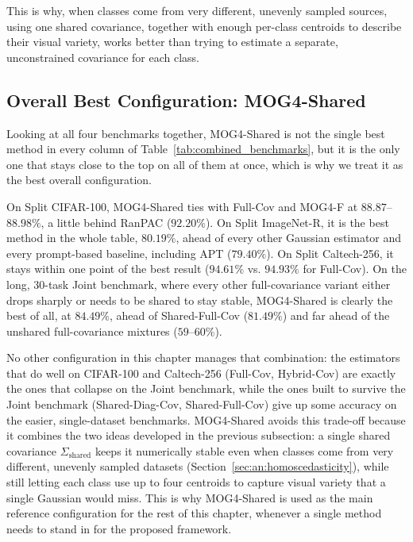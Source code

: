 This is why, when classes come from very different, unevenly sampled sources, using one shared covariance, together with enough per-class centroids to describe their visual variety, works better than trying to estimate a separate, unconstrained covariance for each class.

\subsection{Overall Best Configuration: MOG4-Shared}
\label{sec:an:mog4shared_best}

Looking at all four benchmarks together, MOG4-Shared is not the single best method in every column of Table~\ref{tab:combined_benchmarks}, but it is the only one that stays close to the top on all of them at once, which is why we treat it as the best overall configuration.

On Split CIFAR-100, MOG4-Shared ties with Full-Cov and MOG4-F at $88.87$--$88.98\%$, a little behind RanPAC ($92.20\%$). On Split ImageNet-R, it is the best method in the whole table, $80.19\%$, ahead of every other Gaussian estimator and every prompt-based baseline, including APT ($79.40\%$). On Split Caltech-256, it stays within one point of the best result ($94.61\%$ vs. $94.93\%$ for Full-Cov). On the long, 30-task Joint benchmark, where every other full-covariance variant either drops sharply or needs to be shared to stay stable, MOG4-Shared is clearly the best of all, at $84.49\%$, ahead of Shared-Full-Cov ($81.49\%$) and far ahead of the unshared full-covariance mixtures ($59$--$60\%$).

No other configuration in this chapter manages that combination: the estimators that do well on CIFAR-100 and Caltech-256 (Full-Cov, Hybrid-Cov) are exactly the ones that collapse on the Joint benchmark, while the ones built to survive the Joint benchmark (Shared-Diag-Cov, Shared-Full-Cov) give up some accuracy on the easier, single-dataset benchmarks. MOG4-Shared avoids this trade-off because it combines the two ideas developed in the previous subsection: a single shared covariance $\Sigma_{\text{shared}}$ keeps it numerically stable even when classes come from very different, unevenly sampled datasets (Section~\ref{sec:an:homoscedasticity}), while still letting each class use up to four centroids to capture visual variety that a single Gaussian would miss. This is why MOG4-Shared is used as the main reference configuration for the rest of this chapter, whenever a single method needs to stand in for the proposed framework.

